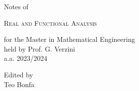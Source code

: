 \documentclass[10pt,a4paper,twoside]{book}
\numberwithin{figure}{section}
\numberwithin{equation}{section}
\begin{document}
\frontmatter

\pagestyle{empty}


\hypertarget{mytitlepage}{} %

\vspace*{\fill}

\begin{center}


	\vspace*{1.5cm}

	{\large Notes of}\\
	
	\vspace*{1.5cm}
	
	{\Huge \textsc{Real and Functional Analysis}}\\
	
	\vspace*{1.5cm}
	
	{\large for the Master in Mathematical Engineering}\\
	\vspace*{0.3cm}
	{\large held by Prof. G. Verzini}\\
	\vspace*{0.3cm}
	{\large a.a. 2023/2024}\\

	\vspace*{5cm}

	{\large Edited by}\\
	\vspace*{0.3cm}
	{\large Teo Bonfa}\\

	\vspace*{1.5cm}

\end{center}
\vspace*{\fill}
\clearpage


\hypertarget{mycopyright}{} %

\clearpage


\cleardoublepage
\pagestyle{toc}
\hypertarget{mytoc}{} %
\bookmark[dest=mytoc,level=chapter]{\contentsname} %
\tableofcontents
\cleardoublepage
\end{document}
